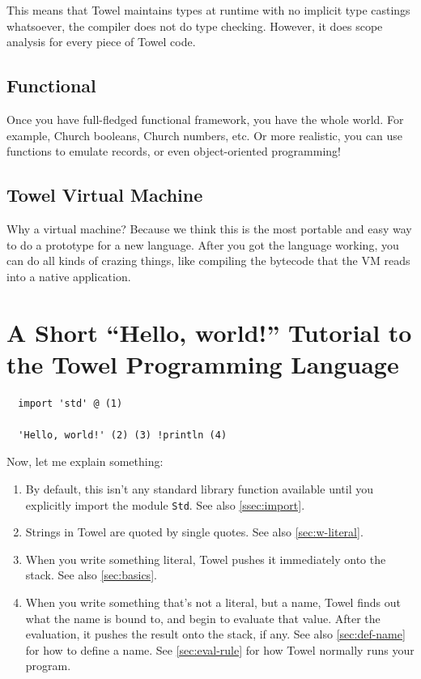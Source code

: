 \documentclass{report}
\begin{document}
This means that Towel maintains types at runtime with no implicit type castings whatsoever, the compiler does not do type checking. However, it does scope analysis for every piece of Towel code.

\section{Functional}

Once you have full-fledged functional framework, you have the whole world. For example, Church booleans, Church numbers, etc. Or more realistic, you can use functions to emulate records, or even object-oriented programming!

\section{Towel Virtual Machine}

Why a virtual machine? Because we think this is the most portable and easy way to do a prototype for a new language. After you got the language working, you can do all kinds of crazing things, like compiling the bytecode that the VM reads into a native application.

\chapter{A Short ``Hello, world!'' Tutorial to the Towel Programming Language}

\begin{mdframed}[style=example]
\begin{verbatim}
  import 'std' @ (1)

  'Hello, world!' (2) (3) !println (4)
\end{verbatim}
\end{mdframed}

Now, let me explain something:
\begin{enumerate}
\item By default, this isn't any standard library function available until you explicitly import the module \texttt{Std}. See also \autoref{ssec:import}.
\item Strings in Towel are quoted by single quotes. See also \autoref{sec:w-literal}.
\item When you write something literal, Towel pushes it immediately onto the stack. See also \autoref{sec:basics}.
\item When you write something that's not a literal, but a name, Towel finds out what the name is bound to, and begin to evaluate that value. After the evaluation, it pushes the result onto the stack, if any. See also \autoref{sec:def-name} for how to define a name. See \autoref{sec:eval-rule} for how Towel normally runs your program.
\end{enumerate}
\end{document}

